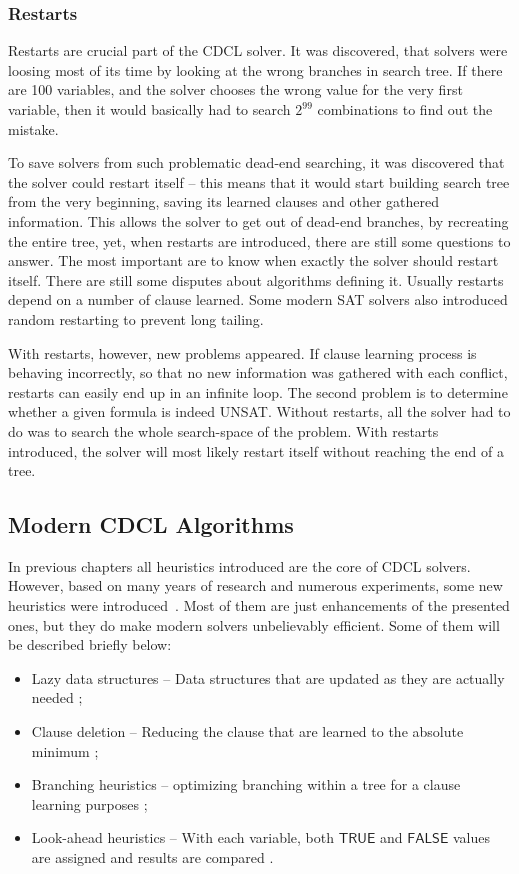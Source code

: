 \documentclass[12pt,english,pdflatex]{aghdpl}
\begin{document}
\subsubsection{Restarts}
\label{subsubsec:Restart}
Restarts are crucial part of the CDCL solver. It was discovered, that
solvers were loosing most of its time by looking at the wrong branches
in search tree. If there are 100 variables, and the solver chooses the
wrong value for the very first variable, then it would basically had
to search $2^{99}$ combinations to find out the mistake. 

To save solvers from such problematic dead-end searching, it was discovered
that the solver could restart itself -- this means  that it would start building
search tree from the very beginning, saving its learned clauses and
other gathered information. This allows the solver to get out of dead-end branches,
by recreating the entire tree, yet, when restarts are introduced,
there are still some questions to answer. The most important are to
know when exactly the solver should restart itself. There are still some
disputes about algorithms defining it. Usually restarts depend on
a number of clause learned. Some modern SAT solvers also introduced
random restarting to prevent long tailing. 

With restarts, however, new problems appeared. If clause learning
process is behaving incorrectly, so that no new information was gathered
with each conflict, restarts can easily end up in an infinite loop. The second
problem is to determine whether a given formula is indeed UNSAT. Without
restarts, all the solver had to do was to search the whole search-space
of the problem. With restarts introduced, the solver will most likely
restart itself without reaching the end of a tree. 

\subsection{Modern CDCL Algorithms}
\label{subsec:ModernCDCL}
In previous chapters all heuristics introduced are the core of CDCL
solvers. However, based on many years of research and numerous experiments,
some new heuristics were introduced~\cite{Biere:2009}. Most of them are just enhancements
of the presented ones, but they do make modern solvers unbelievably efficient.
Some of them will be described briefly below:
\begin{itemize}
\item Lazy data structures -- Data structures that are updated as they are actually needed \cite{alsinet2004max};
\item Clause deletion -- Reducing the clause that are learned to the absolute minimum \cite{sorensson2009minimizing};
\item Branching heuristics -- optimizing branching within a tree for a clause learning purposes \cite{liang2016learning};
\item Look-ahead heuristics -- With each variable, both $\mathsf{TRUE}$ and $\mathsf{FALSE}$ values are assigned and results are compared \cite{heule2011cube}.
\end{itemize}
\end{document}
